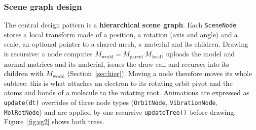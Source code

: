 \documentclass[a4paper, 11pt]{article}
\newcommand{\code}[1]{\texttt{#1}}
\begin{document}
\subsubsection{Scene graph design}

The central design pattern is a \textbf{hierarchical scene graph}. Each \code{SceneNode} stores a local transform made of a position,
a rotation (axis and angle) and a scale, an optional pointer to a shared mesh, a material and its children. Drawing is recursive: a node
computes $M_{\text{world}}=M_{\text{parent}}\,M_{\text{local}}$, uploads the model and normal matrices and its material, issues the draw call
and recurses into its children with $M_{\text{world}}$ (Section~\ref{sec:hier}). Moving a node therefore moves its whole subtree; this is what
attaches an electron to its rotating orbit pivot and the atoms and bonds of a molecule to the rotating root. Animations are expressed as
\code{update(dt)} overrides of three node types (\code{OrbitNode}, \code{VibrationNode}, \code{MolRotNode}) and are applied by one recursive
\code{updateTree()} before drawing. Figure~\ref{fig:sg2} shows both trees.
\end{document}
